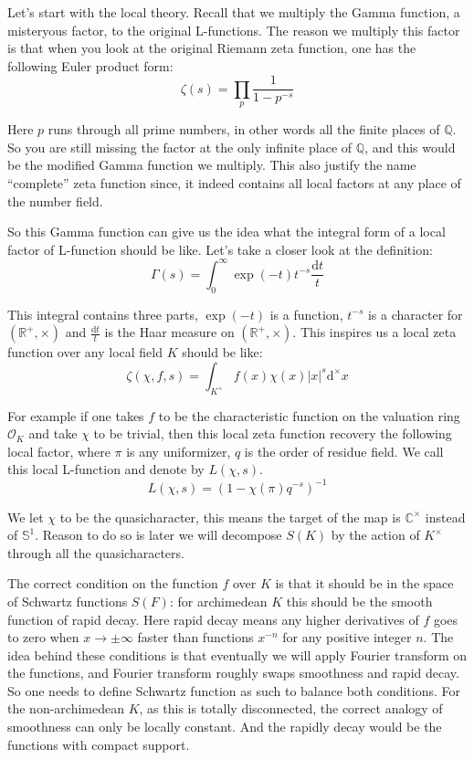 \documentclass[10pt]{article}
\theoremstyle{plain}
\theoremstyle{remark}
\begin{document}
	Let's start with the local theory. Recall that we multiply the Gamma function, a misteryous factor, to the original L-functions. The reason we multiply this factor is that when you look at the original Riemann zeta function, one has the following Euler product form:
	$$\zeta(s)=\prod_{p}\frac{1}{1-p^{-s}}$$
	
	Here $p$ runs through all prime numbers, in other words all the finite places of $\mathbb{Q}$. So you are still missing the factor at the only infinite place of $\mathbb{Q}$, and this would be the modified Gamma function we multiply. This also justify the name ``complete'' zeta function since, it indeed contains all local factors at any place of the number field.
	
	So this Gamma function can give us the idea what the integral form of a local factor of L-function should be like. Let's take a closer look at the definition:
	$$\Gamma(s)=\int_0^{\infty}\exp(-t)t^{-s}\frac{\mathrm{d}t}{t}$$
	
	This integral contains three parts, $\exp(-t)$ is a function, $t^{-s}$ is a character for $(\mathbb{R}^+,\times)$ and $\frac{\mathrm{d}t}{t}$ is the Haar measure on $(\mathbb{R}^+,\times)$. This inspires us a local zeta function over any local field $K$ should be like:
	$$\zeta(\chi,f,s)=\int_{K^{\times}}f(x)\chi(x)|x|^s\mathrm{d}^{\times}x$$
	
	For example if one takes $f$ to be the characteristic function on the valuation ring $\mathscr{O}_K$ and take $\chi$ to be trivial, then this local zeta function recovery the following local factor, where $\pi$ is any uniformizer, $q$ is the order of residue field. We call this local L-function and denote by $L(\chi,s)$.
	$$L(\chi,s)=\left(1-\chi(\pi)q^{-s}\right)^{-1}$$
	
	We let $\chi$ to be the quasicharacter, this means the target of the map is $\mathbb{C}^{\times}$ instead of $\mathbb{S}^1$. Reason to do so is later we will decompose $S(K)$ by the action of $K^{\times}$ through all the quasicharacters.
	
	The correct condition on the function $f$ over $K$ is that it should be in the space of Schwartz functions $S(F)$: for archimedean $K$ this should be the smooth function of rapid decay. Here rapid decay means any higher derivatives of $f$ goes to zero when $x\to\pm\infty$ faster than functions $x^{-n}$ for any positive integer $n$. The idea behind these conditions is that eventually we will apply Fourier transform on the functions, and Fourier transform roughly swaps smoothness and rapid decay. So one needs to define Schwartz function as such to balance both conditions. For the non-archimedean $K$, as this is totally disconnected, the correct analogy of smoothness can only be locally constant. And the rapidly decay would be the functions with compact support.
	
\end{document}

